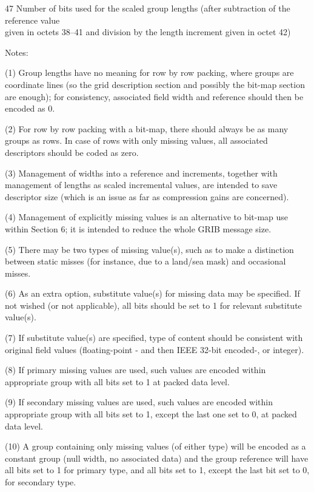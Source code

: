47 Number of bits used for the scaled group lengths (after subtraction of the reference value\\
given in octets 38--41 and division by the length increment given in octet 42)

Notes:

(1) Group lengths have no meaning for row by row packing, where groups are coordinate lines (so the grid description section and possibly the bit-map section are enough); for consistency, associated field width and reference should then be encoded as 0.

(2) For row by row packing with a bit-map, there should always be as many groups as rows. In case of rows with only missing values, all associated descriptors should be coded as zero.

(3) Management of widths into a reference and increments, together with management of lengths as scaled incremental values, are intended to save descriptor size (which is an issue as far as compression gains are concerned).

(4) Management of explicitly missing values is an alternative to bit-map use within Section 6; it is intended to reduce the whole GRIB message size.

(5) There may be two types of missing value(s), such as to make a distinction between static misses (for instance, due to a land/sea mask) and occasional misses.

(6) As an extra option, substitute value(s) for missing data may be specified. If not wished (or not applicable), all bits should be set to 1 for relevant substitute value(s).

(7) If substitute value(s) are specified, type of content should be consistent with original field values (floating-point - and then IEEE 32-bit encoded-, or integer).

(8) If primary missing values are used, such values are encoded within appropriate group with all bits set to 1 at packed data level.

(9) If secondary missing values are used, such values are encoded within appropriate group with all bits set to 1, except the last one set to 0, at packed data level.

(10) A group containing only missing values (of either type) will be encoded as a constant group (null width, no associated data) and the group reference will have all bits set to 1 for primary type, and all bits set to 1, except the last bit set to 0, for secondary type.

